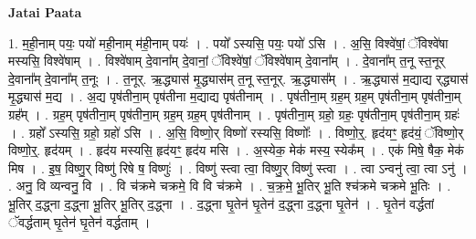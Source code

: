 \documentclass[17pt]{extarticle}
\begin{document}
\textbf{Jatai Paata} \newline

1. म॒ही॒नाम् पयः॒ पयो॑ मही॒नाम् म॑ही॒नाम् पयः॑ । . पयो᳚ ऽस्यसि॒ पयः॒ पयो॑ ऽसि । . अ॒सि॒ विश्वे॑षां॒ ॅविश्वे॑षा मस्यसि॒ विश्वे॑षाम् । . विश्वे॑षाम् दे॒वाना᳚म् दे॒वानां॒ ॅविश्वे॑षां॒ ॅविश्वे॑षाम् दे॒वाना᳚म् । . दे॒वाना᳚म् त॒नू स्त॒नूर् दे॒वाना᳚म् दे॒वाना᳚म् त॒नूः । . त॒नूर्. ऋ॒द्ध्यास॑ मृ॒द्ध्यास॑म् त॒नू स्त॒नूर्. ऋ॒द्ध्यास᳚म् । . ऋ॒द्ध्यास॑ म॒द्याद्य र्‌द्ध्यास॑ मृ॒द्ध्यास॑ म॒द्य । . अ॒द्य पृष॑तीना॒म् पृष॑तीना म॒द्याद्य पृष॑तीनाम् । . पृष॑तीना॒म् ग्रह॒म् ग्रह॒म् पृष॑तीना॒म् पृष॑तीना॒म् ग्रह᳚म् । . ग्रह॒म् पृष॑तीना॒म् पृष॑तीना॒म् ग्रह॒म् ग्रह॒म् पृष॑तीनाम् । . पृष॑तीना॒म् ग्रहो॒ ग्रहः॒ पृष॑तीना॒म् पृष॑तीना॒म् ग्रहः॑ । . ग्रहो᳚ ऽस्यसि॒ ग्रहो॒ ग्रहो॑ ऽसि । . अ॒सि॒ विष्णो॒र् विष्णो॑ रस्यसि॒ विष्णोः᳚ । . विष्णो॒र्॒. हृद॑यꣳ॒॒ हृद॑यं॒ ॅविष्णो॒र् विष्णो॒र्॒. हृद॑यम् । . हृद॑य मस्यसि॒ हृद॑यꣳ॒॒ हृद॑य मसि । . अ॒स्येक॒ मेक॑ मस्य॒ स्येक᳚म् । . एक॑ मिषे॒ षैक॒ मेक॑ मिष । . इ॒ष॒ विष्णु॒र् विष्णु॑ रिषे ष॒ विष्णुः॑ । . विष्णु॑ स्त्वा त्वा॒ विष्णु॒र् विष्णु॑ स्त्वा । . त्वा ऽन्वनु॑ त्वा॒ त्वा ऽनु॑ । . अनु॒ वि व्यन्वनु॒ वि । . वि च॑क्रमे चक्रमे॒ वि वि च॑क्रमे । . च॒क्र॒मे॒ भू॒तिर् भू॒ति श्च॑क्रमे चक्रमे भू॒तिः । . भू॒तिर् द॒द्ध्ना द॒द्ध्ना भू॒तिर् भू॒तिर् द॒द्ध्ना । . द॒द्ध्ना घृ॒तेन॑ घृ॒तेन॑ द॒द्ध्ना द॒द्ध्ना घृ॒तेन॑ । . घृ॒तेन॑ वर्द्धतां ॅवर्द्धताम् घृ॒तेन॑ घृ॒तेन॑ वर्द्धताम् । \newline
\end{document}
